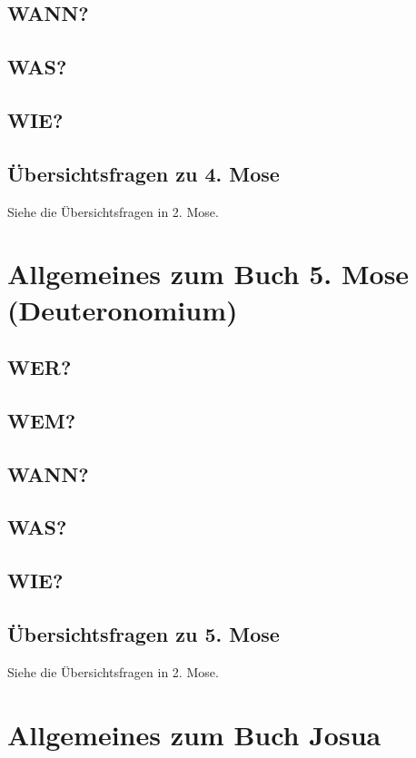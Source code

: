 \subsection{WANN?}
\subsection{WAS?}
\subsection{WIE?}
\subsection{Übersichtsfragen zu 4. Mose}
Siehe die Übersichtsfragen in 2. Mose.
\section{Allgemeines zum Buch 5. Mose (Deuteronomium)}
\subsection{WER?}
\subsection{WEM?}
\subsection{WANN?}
\subsection{WAS?}
\subsection{WIE?}
\subsection{Übersichtsfragen zu 5. Mose}
Siehe die Übersichtsfragen in 2. Mose.
\section{Allgemeines zum Buch Josua}
